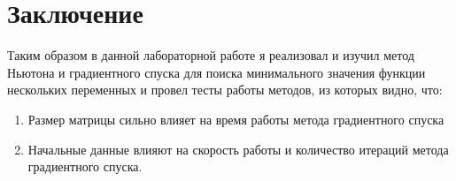 \documentclass[14pt, titlepage,fleqn]{extarticle}
\begin{document}
	\newpage
	\section*{Заключение}
	Таким образом в данной лабораторной работе я реализовал и изучил метод Ньютона и градиентного спуска для поиска минимального значения функции нескольких переменных и провел тесты работы методов, из которых видно, что:
	\begin{enumerate}
		\item Размер матрицы сильно влияет на время работы метода градиентного спуска
		\item Начальные данные влияют на скорость работы и количество итераций метода градиентного спуска.
	\end{enumerate}
\end{document}
